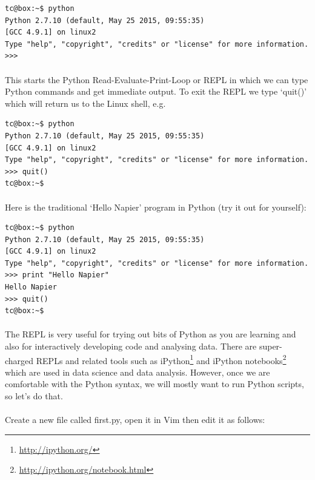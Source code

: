 \documentclass[12pt, a4paper, twoside]{book}
\begin{document}
\begin{lstlisting}[style=DOS]
tc@box:~$ python
Python 2.7.10 (default, May 25 2015, 09:55:35) 
[GCC 4.9.1] on linux2
Type "help", "copyright", "credits" or "license" for more information.
>>> 
\end{lstlisting}
\paragraph{} This starts the Python Read-Evaluate-Print-Loop or REPL in which we can type Python commands and get immediate output. To exit the REPL we type `quit()' which will return us to the Linux shell, e.g.

\begin{lstlisting}[style=DOS]
tc@box:~$ python
Python 2.7.10 (default, May 25 2015, 09:55:35) 
[GCC 4.9.1] on linux2
Type "help", "copyright", "credits" or "license" for more information.
>>> quit()
tc@box:~$ 
\end{lstlisting}

\paragraph{} Here is the traditional `Hello Napier' program in Python (try it out for yourself):

\begin{lstlisting}[style=DOS]
tc@box:~$ python
Python 2.7.10 (default, May 25 2015, 09:55:35) 
[GCC 4.9.1] on linux2
Type "help", "copyright", "credits" or "license" for more information.
>>> print "Hello Napier"
Hello Napier
>>> quit()
tc@box:~$
\end{lstlisting}

\paragraph{} The REPL is very useful for trying out bits of Python as you are learning and also for interactively developing code and analysing data. There are super-charged REPLs and related tools such as iPython\footnote{\url{http://ipython.org/}} and iPython notebooks\footnote{\url{http://ipython.org/notebook.html}} which are used in data science and data analysis. However, once we are comfortable with the Python syntax, we will mostly want to run Python scripts, so let's do that.

\paragraph{} Create a new file called first.py, open it in Vim then edit it as follows:
\end{document}
